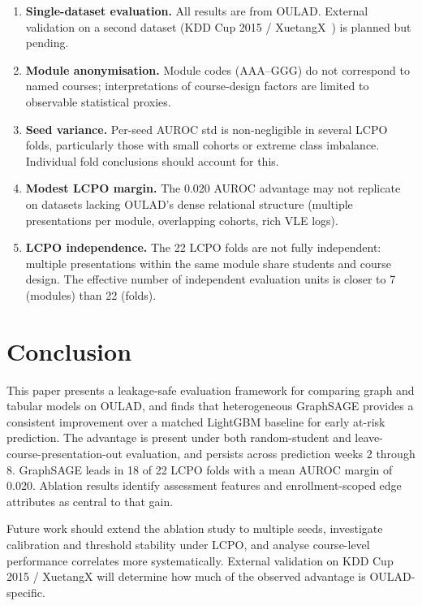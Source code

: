 \documentclass[sigconf,review]{acmart}
\newcommand{\todo}[1]{\textcolor{red}{\textbf{[TODO: #1]}}}
\newcommand{\fullrun}[1]{#1}  %
\begin{document}
\begin{enumerate}
  \item \textbf{Single-dataset evaluation.}  All results are from OULAD\@.
        External validation on a second dataset (KDD Cup 2015 /
        XuetangX~\cite{xuetangx2015}) is planned but pending.
  \item \textbf{Module anonymisation.}  Module codes (AAA--GGG) do not
        correspond to named courses; interpretations of course-design factors
        are limited to observable statistical proxies.
  \item \textbf{Seed variance.}  Per-seed AUROC std is non-negligible in
        several LCPO folds, particularly those with small cohorts or extreme
        class imbalance.  Individual fold conclusions should account for this.
  \item \textbf{Modest LCPO margin.}  The \fullrun{0.020} AUROC advantage
        may not replicate on datasets lacking OULAD's dense relational
        structure (multiple presentations per module, overlapping cohorts,
        rich VLE logs).
  \item \textbf{LCPO independence.}  The 22 LCPO folds are not fully
        independent: multiple presentations within the same module share
        students and course design.  The effective number of independent
        evaluation units is closer to 7 (modules) than 22 (folds).
\end{enumerate}

\section{Conclusion}
\label{sec:conclusion}

This paper presents a leakage-safe evaluation framework for comparing graph
and tabular models on OULAD, and finds that heterogeneous GraphSAGE provides
a consistent improvement over a matched LightGBM baseline for early at-risk
prediction.  The advantage is present under both random-student and
leave-course-presentation-out evaluation, and persists across prediction
weeks 2 through 8.  GraphSAGE leads in \fullrun{18 of 22} LCPO folds with a
mean AUROC margin of \fullrun{0.020}.  Ablation results identify assessment
features and enrollment-scoped edge attributes as central to that gain.

Future work should extend the ablation study to multiple seeds, investigate
calibration and threshold stability under LCPO, and analyse course-level
performance correlates more systematically.  External validation on KDD Cup
2015 / XuetangX will determine how much of the observed advantage is
OULAD-specific.



\end{document}
